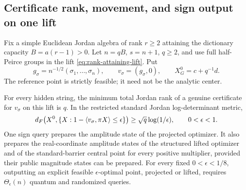 \subsection{Certificate rank, movement, and sign output on one lift}
Fix a simple Euclidean Jordan algebra of rank $r\geq2$ attaining the
dictionary capacity
$B=a(r-1)>0$. Let $n=qB$, $s=n+1$, $q\geq2$, and use full half-Peirce
groups in the lift \eqref{eq:rank-attaining-lift}. Put
\[
 g_\sigma=n^{-1/2}(\sigma_1,\ldots,\sigma_n),\qquad
 v_\sigma=(g_\sigma,0),\qquad X_G^0=c+q^{-1}d.
\]
The reference point is strictly feasible; it need not be the analytic
center.

\begin{theorem}
\label{query:eja}
For every hidden string, the minimum total Jordan rank of a genuine
certificate for $v_\sigma$ on this lift is $q$. In the restricted standard
Jordan log-determinant metric,
\begin{equation}\label{query:eja-distance}
 d_F\bigl(X^0,\{X:1-\langle v_\sigma,\pi X\rangle\leq\epsilon\}\bigr)
 \geq\sqrt q\log(1/\epsilon),\qquad 0<\epsilon<1.
\end{equation}
One sign query prepares the amplitude state of the projected optimizer.
It also prepares the real-coordinate amplitude states of the structured
lifted optimizer and of the standard-barrier central point for every
positive multiplier, provided their public magnitude states can be
prepared. For every fixed $0<\epsilon<1/8$, outputting an explicit
feasible $\epsilon$-optimal point, projected or lifted, requires
$\Theta_\epsilon(n)$ quantum and randomized queries.
\end{theorem}
